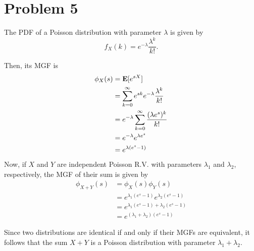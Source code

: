 \documentclass{homework}
\begin{document}
\section{Problem 5}

The PDF of a Poisson distribution with parameter $\lambda$ is given by
\begin{equation*}
    f_X(k) = e^{-\lambda} \frac{\lambda^k}{k!}.
\end{equation*}

Then, its MGF is
\begin{align*}
    \phi_X(s) &= {\bf E}[e^{sX}] \\
        &= \sum_{k=0}^\infty e^{sk} e^{-\lambda} \frac{\lambda^k}{k!} \\
        &= e^{-\lambda} \sum_{k=0}^\infty \frac{(\lambda e^s)^k}{k!} \\
        &= e^{-\lambda} e^{\lambda e^s} \\
        &= e^{\lambda (e^s - 1)}
\end{align*}
Now, if $X$ and $Y$ are independent Poisson R.V. with parameters
$\lambda_1$ and $\lambda_2$, respectively, the MGF of their sum is given by
\begin{align*}
    \phi_{X+Y}(s) &= \phi_X(s) \phi_Y(s) \\
        &= e^{\lambda_1(e^s - 1)} e^{\lambda_2 (e^s - 1)} \\
        &= e^{\lambda_1 (e^s-1) + \lambda_2(e^s - 1)} \\
        &= e^{(\lambda_1 + \lambda_2)(e^s - 1)}
\end{align*}

Since two distributions are identical if and only if their MGFs are equivalent,
it follows that the sum $X+Y$ is a Poisson distribution with parameter $\lambda_1 + \lambda_2$.
\end{document}
